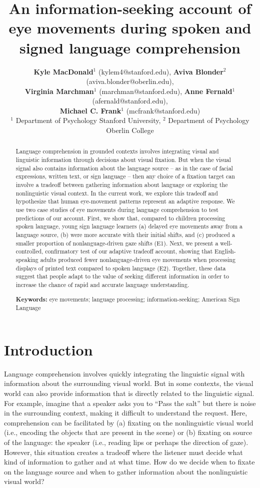 \documentclass[10pt, letterpaper]{article}
\title{An information-seeking account of eye movements during spoken and signed
language comprehension}
\author{ {\large \bf Kyle MacDonald}$^1$ (kylem4@stanford.edu), {\large \bf Aviva Blonder}$^2$ (aviva.blonder@oberlin.edu), \\  {\large \bf Virginia Marchman}$^1$ (marchman@stanford.edu), {\large \bf Anne Fernald}$^1$ (afernald@stanford.edu), \\ {\large \bf Michael C. Frank}$^1$ (mcfrank@stanford.edu)  \\
   $^1$ Department of Psychology Stanford University, $^2$ Department of Psychology Oberlin College}
\begin{document}
\maketitle

\begin{abstract}
Language comprehension in grounded contexts involves integrating visual
and linguistic information through decisions about visual fixation. But
when the visual signal also contains information about the language
source -- as in the case of facial expressions, written text, or sign
language -- then any choice of a fixation target can involve a tradeoff
between gathering information about language or exploring the
nonlinguistic visual context. In the current work, we explore this
tradeoff and hypothesize that human eye-movement patterns represent an
adaptive response. We use two case studies of eye movements during
language comprehension to test predictions of our account. First, we
show that, compared to children processing spoken language, young sign
language learners (a) delayed eye movements away from a language source,
(b) were more accurate with their initial shifts, and (c) produced a
smaller proportion of nonlanguage-driven gaze shifts (E1). Next, we
present a well-controlled, confirmatory test of our adaptive tradeoff
account, showing that English-speaking adults produced fewer
nonlanguage-driven eye movements when processing displays of printed
text compared to spoken language (E2). Together, these data suggest that
people adapt to the value of seeking different information in order to
increase the chance of rapid and accurate language understanding.

\textbf{Keywords:}
eye movements; language processing; information-seeking; American Sign
Language
\end{abstract}

\section{Introduction}\label{introduction}

Language comprehension involves quickly integrating the linguistic
signal with information about the surrounding visual world. But in some
contexts, the visual world can also provide information that is directly
related to the linguistic signal. For example, imagine that a speaker
asks you to ``Pass the salt'' but there is noise in the surrounding
context, making it difficult to understand the request. Here,
comprehension can be facilitated by (a) fixating on the nonlinguistic
visual world (i.e., encoding the objects that are present in the scene)
or (b) fixating on source of the language: the speaker (i.e., reading
lips or perhaps the direction of gaze). However, this situation creates
a tradeoff where the listener must decide what kind of information to
gather and at what time. How do we decide when to fixate on the language
source and when to gather information about the nonlinguistic visual
world?
\end{document}
